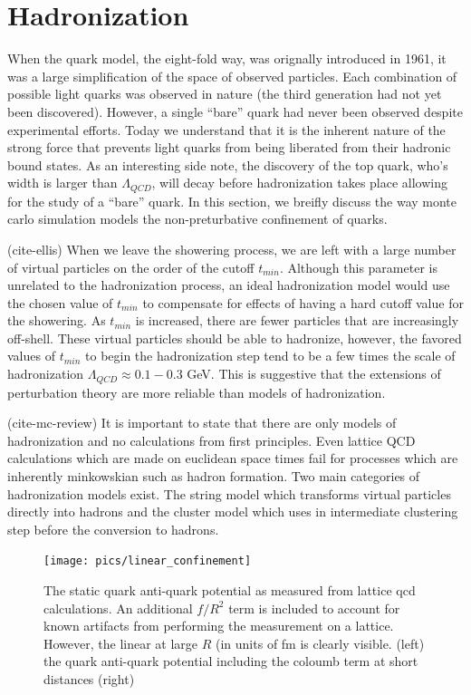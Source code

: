 \section{Hadronization} 

When the quark model, the eight-fold way, was orignally introduced in 1961, it was a large simplification of the space of observed  particles. Each combination of possible light quarks was observed in nature (the third generation had not 
yet been discovered). However, a  single ``bare'' quark had never been observed despite experimental efforts. Today
we understand that it is the inherent nature of the strong force that prevents light quarks from being liberated from their 
hadronic bound states. As an interesting side note, the discovery of the top quark, who's width is  larger than $\Lambda_{QCD}$, 
will decay before hadronization takes place allowing for the study of a ``bare'' quark. In this section, we breifly discuss
 the way  monte carlo simulation models the non-preturbative confinement of quarks.

(cite-ellis) When we leave the showering process, we are left with a large number of virtual particles on the order of the cutoff $t_{min}$. Although this
parameter is unrelated to the hadronization process, an ideal hadronization model would use the chosen value of $t_{min}$ to compensate for
 effects of having a hard cutoff value for the showering. 
 As $t_{min}$ is increased, there are fewer particles that are increasingly off-shell. These virtual particles should be
 able to hadronize, however, the favored values of $t_{min}$ to begin the hadronization step tend to be a few times the
 scale of hadronization $\Lambda_{QCD} \approx 0.1 - 0.3$ GeV. This is suggestive that the extensions of perturbation theory
 are more reliable than models of hadronization.

(cite-mc-review) It is important to state that there are only models of hadronization and no calculations from first principles. 
Even lattice QCD calculations which are made on euclidean space times fail for processes which are inherently minkowskian 
such as hadron formation. Two main categories of hadronization models exist. The string 
model which transforms virtual particles directly into hadrons and the cluster model which uses in intermediate clustering step before
the conversion to hadrons. 

\begin{figure}
\begin{center}
\texttt{[image: pics/linear\_confinement]}
\end{center}
\caption{The static quark anti-quark potential as measured from lattice qcd calculations. An additional $f/R^2$ term is included to
account for known artifacts from performing the measurement on a lattice. However, the linear at large $R$ (in units
of fm  is clearly visible. (left) the quark anti-quark potential 
including the coloumb term at short distances (right)}
\label{fig:linear_confinement}
\end{figure}

